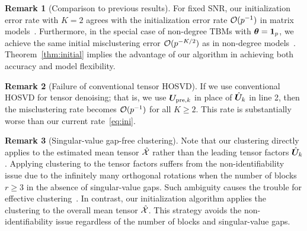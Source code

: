 \documentclass[journal]{IEEEtran}
\theoremstyle{definition}
\theoremstyle{definition}
\newtheorem{rmk}{Remark}
\begin{document}
\begin{rmk}[Comparison to previous results] For fixed SNR, our initialization error rate with $K=2$ agrees with the initialization error rate $\mathcal{O}(p^{-1})$ in matrix models~\citep{gao2018community}. Furthermore, in the special case of non-degree TBMs with $\boldsymbol{\theta} = \mathbf{1}_p$, we achieve the same initial misclustering error $\mathcal{O}(p^{-K/2})$ as in non-degree models~\citep{han2020exact}. Theorem~\ref{thm:initial} implies the advantage of our algorithm in achieving both accuracy and model flexibility. 
\end{rmk}


\begin{rmk}[Failure of conventional tensor HOSVD] If we use conventional HOSVD for tensor denoising; that is, we use $\bm{U}_{\text{pre},k}$ in place of $\hat {\bm{U}}_k$ in line 2, then the misclustering rate becomes $\mathcal{O}(p^{-1})$ for all $K\geq 2$. This rate is substantially worse than our current rate~\eqref{eq:ini}.
\end{rmk}


\begin{rmk}[Singular-value gap-free clustering] Note that our clustering directly applies to the estimated mean tensor $\hat {\mathcal{X}}$ rather than the leading tensor factors $\hat {\bm{U}}_k$. Applying clustering to the tensor factors suffers from the non-identifiability issue due to the infinitely many orthogonal rotations when the number of blocks $r \geq 3$ in the absence of singular-value gaps. 
Such ambiguity causes the trouble for effective clustering~\citep{abbe2020entrywise}. In contrast, our initialization algorithm applies the clustering to the overall mean tensor $\hat {\mathcal{X}}$. This strategy avoids the non-identifiability issue regardless of the number of blocks and singular-value gaps.  
\end{rmk}
\end{document}
